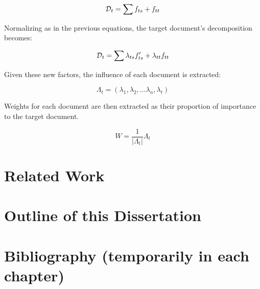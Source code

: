 \documentclass[../dissertation.tex]{subfiles}
\begin{document}
\begin{equation} \label{eq:influence_factors}
  \mathcal{D}_t = \sum f_{ts} + f_{tt}
\end{equation}

Normalizing as in the previous equations, the target
document's decomposition becomes:

\begin{equation} \label{eq:influence_factors_normalized}
  \mathcal{D}_t = \sum \lambda_{ts} f'_{ts} + \lambda_{tt} f_{tt}
\end{equation}

Given these new factors, the influence of each document is extracted:

\begin{equation} \label{eq:document_lambda}
  \Lambda_t = (\lambda_1, \lambda_2, \ldots \lambda_n, \lambda_t)
\end{equation}

Weights for each document are then extracted as their proportion of
importance to the target document.

\begin{equation} \label{eq:document_weights}
  W = \dfrac{1}{|\Lambda_t|} \Lambda_t
\end{equation}

\section{Related Work}

\section{Outline of this Dissertation}

\section{Bibliography (temporarily in each chapter)}


\end{document}
